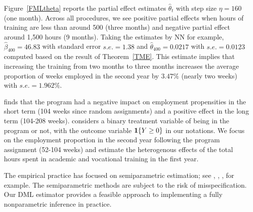 \documentclass[lettersize, 12pt]{article}
\begin{document}
Figure~\ref{FMLtheta} reports the partial effect estimates $\hat\theta_t$ with step size $\eta =160$ (one month).
Across all procedures, we see positive partial effects when hours of training are less than around 500 (three months)
and negative partial effect around 1,500 hours (9 months).
Taking the estimates by NN for example, 
$\hat \beta_{400} = 46.83$ with standard error $s.e. = 1.38$ and $\hat \theta_{400} = 0.0217$ with $s.e. = 0.0123$ computed based on the result of Theorem~\ref{TME}.
This estimate implies that increasing the training from two months to three months increases the average proportion of weeks employed in the second year by $3.47\%$ (nearly two weeks) with $s.e. = 1.962\%$.


\cite{Lee09RES} finds that the program had a negative impact on employment propensities in the short term (104 weeks since random assignments) and a positive effect in the long term (104-208 weeks).
\cite{Lee09RES} considers a binary treatment variable of being in the program or not, with the outcome variable ${\bf 1}\{Y \geq 0\}$ in our notations.
We focus on the employment proportion in the second year following the program assignment (52-104 weeks)
and estimate the heterogenous effects of the total hours spent in academic and vocational training in the first year.

The empirical practice has focused on semiparametric estimation; see \cite{FFGN12ReStat}, \cite{HHLP}, \cite{Lee}, for example.
The semiparametric methods are subject to the risk of misspecification.
Our DML estimator provides a feasible approach to implementing a fully nonparametric inference in practice.




\end{document}
